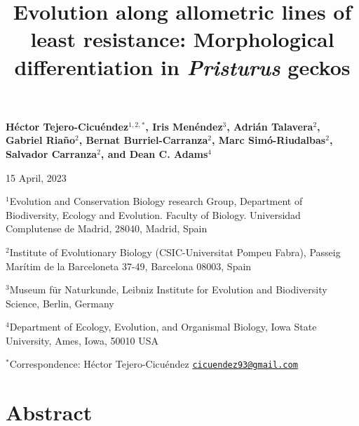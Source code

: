 \documentclass[
  11pt,
]{article}
\title{Evolution along allometric lines of least resistance:
Morphological differentiation in \emph{Pristurus} geckos}
\author{}
\date{\vspace{-2.5em}}
\begin{document}
\maketitle

\begin{center}
\textbf{H{\'{e}}ctor Tejero-Cicu{\'{e}}ndez$^{1,2,*}$,  Iris Men{\'{e}}ndez$^{3}$, Adri{\'{a}}n Talavera$^{2}$, Gabriel Riaño$^{2}$, Bernat Burriel-Carranza$^{2}$, Marc Sim{\'{o}}-Riudalbas$^{2}$, Salvador Carranza$^{2}$, and Dean C. Adams$^{4}$}
\end{center}

\begin{center}15 April, 2023\end{center}

\(^{1}\)Evolution and Conservation Biology research Group, Department of
Biodiversity, Ecology and Evolution. Faculty of Biology. Universidad
Complutense de Madrid, 28040, Madrid, Spain

\(^{2}\)Institute of Evolutionary Biology (CSIC-Universitat Pompeu
Fabra), Passeig Marítim de la Barceloneta 37-49, Barcelona 08003, Spain

\(^{3}\)Museum für Naturkunde, Leibniz Institute for Evolution and
Biodiversity Science, Berlin, Germany

\(^{4}\)Department of Ecology, Evolution, and Organismal Biology, Iowa
State University, Ames, Iowa, 50010 USA

\(^{*}\)Correspondence: Héctor Tejero-Cicuéndez
\href{mailto:cicuendez93@gmail.com}{\nolinkurl{cicuendez93@gmail.com}}

\newpage

\hypertarget{abstract}{%
\section{Abstract}\label{abstract}}
\end{document}
